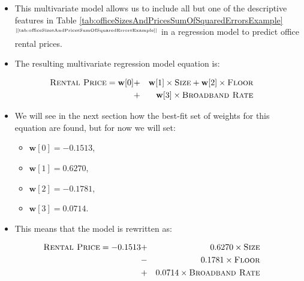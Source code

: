 \documentclass[xcolor={table}]{beamer}
\newcommand{\featN}[1]{\textsc{#1}}
\newcommand{\ourRef}[1]{\ref{#1} $^{\text{\tiny[\pageref{#1}]}}$}
\begin{document}
 \begin{frame} 
 \begin{itemize}
\item This multivariate model allows us to include all but one of the descriptive features in Table \ourRef{tab:officeSizesAndPricesSumOfSquaredErrorsExample} in a regression model to predict office rental prices. 
\item The resulting multivariate regression model equation is:
\end{itemize}
\begin{eqnarray*}
	\featN{Rental Price} = \mathbf{w}[0] & + &  \mathbf{w}[1] \times \featN{Size} + \mathbf{w}[2] \times \featN{Floor} \\
	 & + &  \mathbf{w}[3] \times \featN{Broadband~Rate}
\end{eqnarray*}
\end{frame} 


 \begin{frame} 
\begin{itemize}
\item We will see in the next section how the best-fit set of weights for this equation are found, but for now we will set:
\begin{itemize}
\item $\mathbf{w}[0] = -0.1513$, 
\item $\mathbf{w}[1] = 0.6270$, 
\item $\mathbf{w}[2] = -0.1781$,
\item $\mathbf{w}[3] = 0.0714$. 
\end{itemize}
 \item This means that the model is rewritten as:
\end{itemize}
\begin{eqnarray*}
	\featN{Rental Price} =  -0.1513 	 &+&  0.6270 \times \featN{Size}\\
			& - &  0.1781 \times \featN{Floor} \\	 														& + & 0.0714 \times \featN{Broadband~Rate}
\end{eqnarray*}
\end{frame} 
\end{document}
